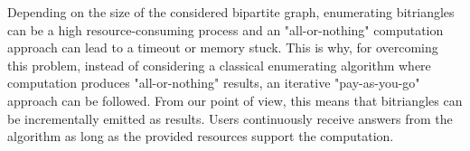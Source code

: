 Depending on the size of the considered bipartite graph, enumerating bitriangles can be a high resource-consuming process and an "all-or-nothing" computation approach can lead to a timeout or memory stuck. 
This is why, for overcoming this problem, instead of considering a classical enumerating algorithm where computation produces "all-or-nothing" results, an iterative "pay-as-you-go" approach \cite{guo2012does} can be followed. 
From our point of view, this means that bitriangles can be incrementally emitted as results. Users continuously receive answers from the algorithm as long as the provided resources support the computation.

